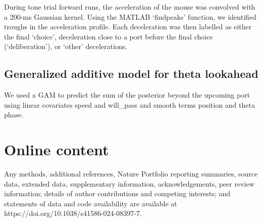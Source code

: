 During tone trial forward runs, the acceleration of the mouse was convolved with a 200-ms Gaussian kernel. Using the MATLAB `findpeaks' function, we identified troughs in the acceleration profile. Each deceleration was then labelled as either the final `choice', deceleration close to a port before the final choice (`deliberation'), or `other' decelerations.

\subsection{Generalized additive model for theta lookahead}

We used a GAM to predict the sum of the posterior beyond the upcoming port using linear covariates speed and will\_pass and smooth terms position and theta phase.

\section*{Online content}

Any methods, additional references, Nature Portfolio reporting summaries, source data, extended data, supplementary information, acknowledgements, peer review information; details of author contributions and competing interests; and statements of data and code availability are available at https://doi.org/10.1038/s41586-024-08397-7.
